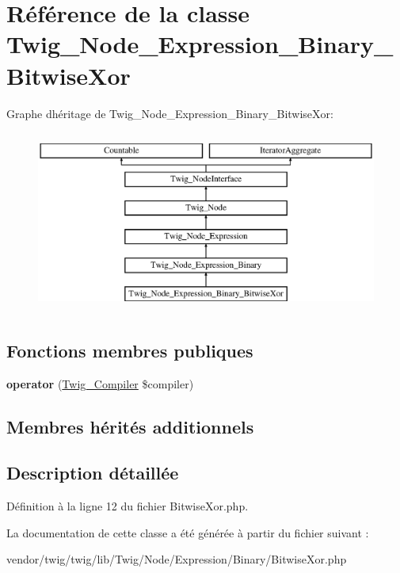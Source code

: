 \hypertarget{class_twig___node___expression___binary___bitwise_xor}{}\section{Référence de la classe Twig\+\_\+\+Node\+\_\+\+Expression\+\_\+\+Binary\+\_\+\+Bitwise\+Xor}
\label{class_twig___node___expression___binary___bitwise_xor}
Graphe d\textquotesingle{}héritage de Twig\+\_\+\+Node\+\_\+\+Expression\+\_\+\+Binary\+\_\+\+Bitwise\+Xor\+:\begin{figure}[H]
\begin{center}
\leavevmode
\includegraphics[height=6.000000cm]{class_twig___node___expression___binary___bitwise_xor}
\end{center}
\end{figure}
\subsection*{Fonctions membres publiques}
\begin{DoxyCompactItemize}
\item 
{\bfseries operator} (\hyperlink{class_twig___compiler}{Twig\+\_\+\+Compiler} \$compiler)\hypertarget{class_twig___node___expression___binary___bitwise_xor_af77318ec88d5f8a508684970a150b670}{}\label{class_twig___node___expression___binary___bitwise_xor_af77318ec88d5f8a508684970a150b670}

\end{DoxyCompactItemize}
\subsection*{Membres hérités additionnels}


\subsection{Description détaillée}


Définition à la ligne 12 du fichier Bitwise\+Xor.\+php.



La documentation de cette classe a été générée à partir du fichier suivant \+:\begin{DoxyCompactItemize}
\item 
vendor/twig/twig/lib/\+Twig/\+Node/\+Expression/\+Binary/Bitwise\+Xor.\+php\end{DoxyCompactItemize}
